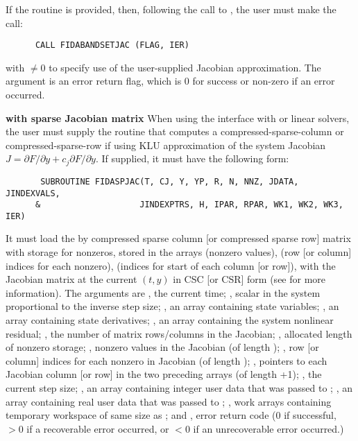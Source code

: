 \begin{Steps}
  If the  routine is provided, then, following the call to
  , the user must make the call:
\begin{verbatim}
      CALL FIDABANDSETJAC (FLAG, IER)
\end{verbatim}
  with  $\neq 0$ to specify use of the user-supplied Jacobian
  approximation.  The argument  is an error return flag, which is $0$ 
  for success or non-zero if an error occurred.

  
  {\bf {\idadls} with sparse Jacobian matrix}
   When using the {\idadls} interface with {\sunlinsolklu} or
  {\sunlinsolslumt} linear solvers, the user must 
  supply the  routine that computes a
  compressed-sparse-column or compressed-sparse-row if using KLU
  approximation of the system Jacobian
  $J = \partial F / \partial y + c_j \partial F / \partial \dot{y}$.
  If supplied, it must have the following form:
\begin{verbatim}
       SUBROUTINE FIDASPJAC(T, CJ, Y, YP, R, N, NNZ, JDATA, JINDEXVALS, 
      &                    JINDEXPTRS, H, IPAR, RPAR, WK1, WK2, WK3, IER)
\end{verbatim}
  It must load the  by  
  compressed sparse column  [or compressed sparse row] matrix 
  with storage for  nonzeros, stored in the arrays  (nonzero
  values),  (row [or column] indices for each nonzero),  (indices 
  for start of each column [or row]), with the Jacobian matrix at the current
  $(t, y)$ in CSC [or CSR] form (see  for more information).
 The arguments are , the current time; , scalar in the system 
 proportional to the inverse step size; , an array containing 
 state variables; , an array containing state derivatives;
 , an array containing the system nonlinear residual;
 , the number of matrix rows/columns 
 in the Jacobian; , allocated length of nonzero storage; ,
 nonzero values in the Jacobian (of length );
 , row [or column] indices for each nonzero in Jacobian (of length );
 , pointers to each Jacobian column [or row] in the two preceding arrays
 (of length +1); , the current step size; 
 , an array containing integer user data that was 
 passed to ; , an array containing real user 
 data that was passed to ; 
 , work arrays containing temporary workspace 
 of same size as ; and , error return code (0 if successful,
 $>0$ if a recoverable error occurred, or $<0$ if an unrecoverable error occurred.)



\end{Steps}
